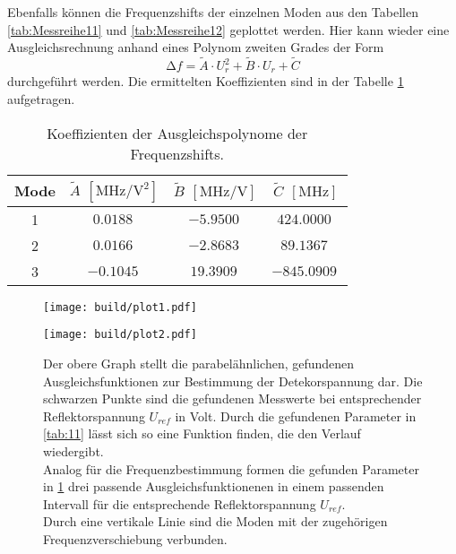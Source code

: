 Ebenfalls können die Frequenzshifts der einzelnen Moden aus den Tabellen \ref{tab:Messreihe11} und \ref{tab:Messreihe12} geplottet werden. Hier kann wieder eine Ausgleichsrechnung anhand eines Polynom zweiten Grades der Form 
\begin{equation*}
\increment f = \tilde{A} \cdot U_{r}^2 + \tilde{B} \cdot  U_{r} + \tilde{C}
\end{equation*}
durchgeführt werden. Die ermittelten Koeffizienten sind in der Tabelle \ref{tab:12} aufgetragen.
\begin{table}
    \centering
    \caption{Koeffizienten der Ausgleichspolynome der Frequenzshifts.} 
    \label{tab:12}
    \begin{tabular}{c | c c c}
        \toprule
        Mode & $\tilde{A}$ $[\si{\mega\hertz\per\volt\squared}] $ & $\tilde{B} $ $[\si{\mega\hertz\per\volt}] $ & $\tilde{C}$ $[\si{\mega\hertz}]$ \\
        \midrule
        1      &      $\SI{0.0188}{}$        &       $\SI{-5.9500}{}$              &        $\SI{424.0000}{}$ \\
        2      &      $\SI{0.0166}{}$        &       $\SI{-2.8683}{}$              &        $\SI{89.1367}{}$ \\
        3      &      $\SI{-0.1045}{}$        &       $\SI{19.3909}{}$              &        $\SI{-845.0909}{}$ \\
        
    \end{tabular}
\end{table}

\begin{figure}
    \centering
    \texttt{[image: build/plot1.pdf]}
\end{figure}
\begin{figure}
    \centering
    \texttt{[image: build/plot2.pdf]}
    \label{fig:123}
    \caption{Der obere Graph stellt die parabelähnlichen, gefundenen Ausgleichsfunktionen zur Bestimmung der Detekorspannung dar. Die schwarzen
            Punkte sind die gefundenen Messwerte bei entsprechender Reflektorspannung $U_{ref}$ in Volt. Durch die gefundenen Parameter in \ref{tab:11}
            lässt sich so eine Funktion finden, die den Verlauf wiedergibt.    \\
            Analog für die Frequenzbestimmung formen die gefunden Parameter in \ref{tab:12} drei passende Ausgleichsfunktionenen in einem passenden 
            Intervall für die entsprechende Reflektorspannung $U_{ref}$. \\
            Durch eine vertikale Linie sind die Moden mit der zugehörigen Frequenzverschiebung verbunden.} 
    \label{fig:gimp}
\end{figure}

